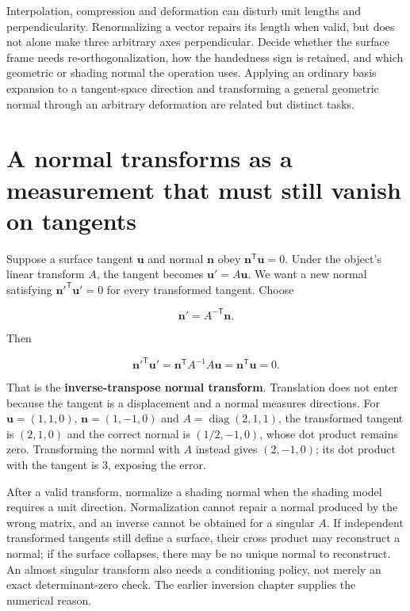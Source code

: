 Interpolation, compression and deformation can disturb unit lengths and perpendicularity. Renormalizing a vector repairs its length when valid, but does not alone make three arbitrary axes perpendicular. Decide whether the surface frame needs re-orthogonalization, how the handedness sign is retained, and which geometric or shading normal the operation uses. Applying an ordinary basis expansion to a tangent-space direction and transforming a general geometric normal through an arbitrary deformation are related but distinct tasks.

\section{A normal transforms as a measurement that must still vanish on tangents}\label{01-foundations-i-ch019-a-normal-transforms-as-a-measurement-that-must-still-vanish-on-tangents}

\hypertarget{01-foundations-i-ch019-a-normal-transforms-as-a-measurement-that-must-still-vanish-on-tangents}{}

Suppose a surface tangent \(\mathbf u\) and normal \(\mathbf n\) obey \(\mathbf n^{\mathsf T}\mathbf u=0\). Under the object's linear transform \(A\), the tangent becomes \(\mathbf u'=A\mathbf u\). We want a new normal satisfying \(\mathbf n'^{\mathsf T}\mathbf u'=0\) for every transformed tangent. Choose

\[
\mathbf n'=A^{-\mathsf T}\mathbf n.
\]

Then

\[
\mathbf n'^{\mathsf T}\mathbf u'
=\mathbf n^{\mathsf T}A^{-1}A\mathbf u
=\mathbf n^{\mathsf T}\mathbf u=0.
\]

That is the \textbf{inverse-transpose normal transform}. Translation does not enter because the tangent is a displacement and a normal measures directions. For \(\mathbf u=(1,1,0)\), \(\mathbf n=(1,-1,0)\) and \(A=\operatorname{diag}(2,1,1)\), the transformed tangent is \((2,1,0)\) and the correct normal is \((1/2,-1,0)\), whose dot product remains zero. Transforming the normal with \(A\) instead gives \((2,-1,0)\); its dot product with the tangent is \(3\), exposing the error.

After a valid transform, normalize a shading normal when the shading model requires a unit direction. Normalization cannot repair a normal produced by the wrong matrix, and an inverse cannot be obtained for a singular \(A\). If independent transformed tangents still define a surface, their cross product may reconstruct a normal; if the surface collapses, there may be no unique normal to reconstruct. An almost singular transform also needs a conditioning policy, not merely an exact determinant-zero check. The earlier inversion chapter supplies the numerical reason.


